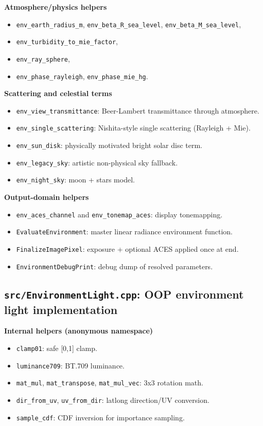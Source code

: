 \documentclass[11pt]{article}
\begin{document}
\textbf{Atmosphere/physics helpers}
\begin{itemize}[leftmargin=1.5em]
  \item \verb|env_earth_radius_m|, \verb|env_beta_R_sea_level|, \verb|env_beta_M_sea_level|,
  \item \verb|env_turbidity_to_mie_factor|,
  \item \verb|env_ray_sphere|,
  \item \verb|env_phase_rayleigh|, \verb|env_phase_mie_hg|.
\end{itemize}

\textbf{Scattering and celestial terms}
\begin{itemize}[leftmargin=1.5em]
  \item \verb|env_view_transmittance|: Beer-Lambert transmittance through atmosphere.
  \item \verb|env_single_scattering|: Nishita-style single scattering (Rayleigh + Mie).
  \item \verb|env_sun_disk|: physically motivated bright solar disc term.
  \item \verb|env_legacy_sky|: artistic non-physical sky fallback.
  \item \verb|env_night_sky|: moon + stars model.
\end{itemize}

\textbf{Output-domain helpers}
\begin{itemize}[leftmargin=1.5em]
  \item \verb|env_aces_channel| and \verb|env_tonemap_aces|: display tonemapping.
  \item \verb|EvaluateEnvironment|: master linear radiance environment function.
  \item \verb|FinalizeImagePixel|: exposure + optional ACES applied once at end.
  \item \verb|EnvironmentDebugPrint|: debug dump of resolved parameters.
\end{itemize}

\subsection{\texttt{src/EnvironmentLight.cpp}: OOP environment light implementation}
\textbf{Internal helpers (anonymous namespace)}
\begin{itemize}[leftmargin=1.5em]
  \item \verb|clamp01|: safe [0,1] clamp.
  \item \verb|luminance709|: BT.709 luminance.
  \item \verb|mat_mul|, \verb|mat_transpose|, \verb|mat_mul_vec|: 3x3 rotation math.
  \item \verb|dir_from_uv|, \verb|uv_from_dir|: latlong direction/UV conversion.
  \item \verb|sample_cdf|: CDF inversion for importance sampling.
\end{itemize}
\end{document}
